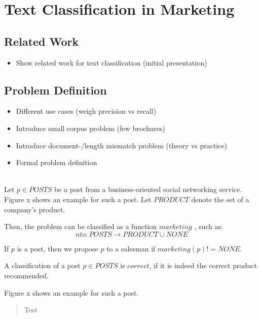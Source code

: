 
\section{Text Classification in Marketing}
\label{sec:background}

\subsection{Related Work}

\begin{itemize}
	\item Show related work for text classification (initial presentation)
\end{itemize}

\subsection{Problem Definition}
\begin{itemize}
	\item Different use cases (weigh precision vs recall)
	\item Introduce small corpus problem (few brochures)
	\item Introduce document-/length mismatch problem (theory vs practice)
	\item Formal problem definition
\end{itemize}

 \\
Let $p \in POSTS$ be a post from a business-oriented social networking service.
Figure x shows an example for such a post.
Let $PRODUCT$ denote the set of a company's product.

Then, the problem can be classified as a function $marketing$ , such as:
\begin{displaymath}
	nto: POSTS \to PRODUCT \cup {NONE}
\end{displaymath}

If $p$ is a post, then we propose $p$ to a salesman if $marketing(p) != NONE$.

A classification of a post $p \in POSTS$ is $correct$, if it is indeed the correct product recommended.

Figure x shows an example for such a post.

\begin{quote}
	\centering
\caption{Test}\label{fig:1a}
\end{quote}

